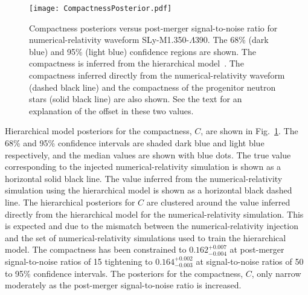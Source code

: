 \documentclass[../Thesis.tex]{subfiles}
\begin{document}
      \begin{figure}[H]
         \centering
         \texttt{[image: CompactnessPosterior.pdf]}
         \caption{Compactness posteriors versus post-merger signal-to-noise ratio for numerical-relativity waveform SLy-M1.350-$\Lambda$390. The 68\% (dark blue) and 95\% (light blue) confidence regions are shown. The compactness is inferred from the hierarchical model~\cite{Easter2019}. The compactness inferred directly from the numerical-relativity waveform (dashed black line) and the compactness of the progenitor neutron stars (solid black line) are also shown. See the text for an explanation of the offset in these two values.}
         \label{fig:CompactnessvsSNR}
     \end{figure}  
     Hierarchical model posteriors for the compactness, $C$, are shown in Fig.~\ref{fig:CompactnessvsSNR}. 
     The 68\% and 95\% confidence intervals are shaded dark blue and light blue  respectively, and the median values are shown with blue dots.
     The true value corresponding to the injected numerical-relativity simulation is shown as a horizontal solid black line.
     The value inferred from the numerical-relativity simulation using the hierarchical model is shown as a horizontal black dashed line. 
     The hierarchical posteriors for $C$ are clustered around the value inferred directly from the hierarchical model for the numerical-relativity simulation.
     This is expected and due to the mismatch between the numerical-relativity injection and the set of numerical-relativity simulations used to train the hierarchical model.
     The compactness has been constrained to $0.162^{+0.007}_{-0.004}$ at post-merger signal-to-noise ratios of 15 tightening to  $0.164^{+0.002}_{-0.003}$ at signal-to-noise ratios of 50 to 95\% confidence intervals. 
     The posteriors for the compactness, $C$, only narrow moderately as the post-merger signal-to-noise ratio is increased.
 
\end{document}
